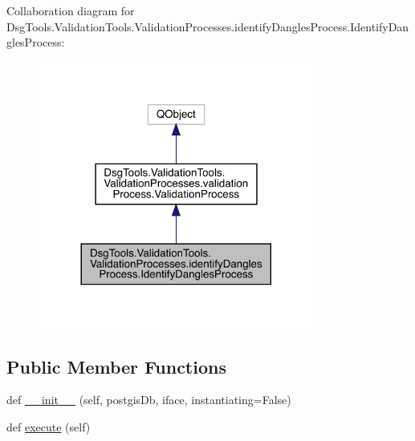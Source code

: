 Collaboration diagram for Dsg\+Tools.\+Validation\+Tools.\+Validation\+Processes.\+identify\+Dangles\+Process.\+Identify\+Dangles\+Process\+:
\nopagebreak
\begin{figure}[H]
\begin{center}
\leavevmode
\includegraphics[width=257pt]{class_dsg_tools_1_1_validation_tools_1_1_validation_processes_1_1identify_dangles_process_1_1_id72ad80dd66f13be7e7000b9559d315a5}
\end{center}
\end{figure}
\subsection*{Public Member Functions}
\begin{DoxyCompactItemize}
\item 
def \mbox{\hyperlink{class_dsg_tools_1_1_validation_tools_1_1_validation_processes_1_1identify_dangles_process_1_1_identify_dangles_process_a2ea4a17515bd0a10c22e82c0a1bda84d}{\+\_\+\+\_\+init\+\_\+\+\_\+}} (self, postgis\+Db, iface, instantiating=False)
\item 
def \mbox{\hyperlink{class_dsg_tools_1_1_validation_tools_1_1_validation_processes_1_1identify_dangles_process_1_1_identify_dangles_process_ac0b9f0f92b710f37e903f826455f11dd}{execute}} (self)
\end{DoxyCompactItemize}
